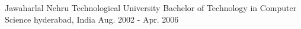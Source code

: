 \cventry
    {Jawaharlal Nehru Technological University} %
    {Bachelor of Technology in Computer Science} %
    {hyderabad, India} %
    {Aug. 2002 - Apr. 2006} %
    {
    }
    {
    }
